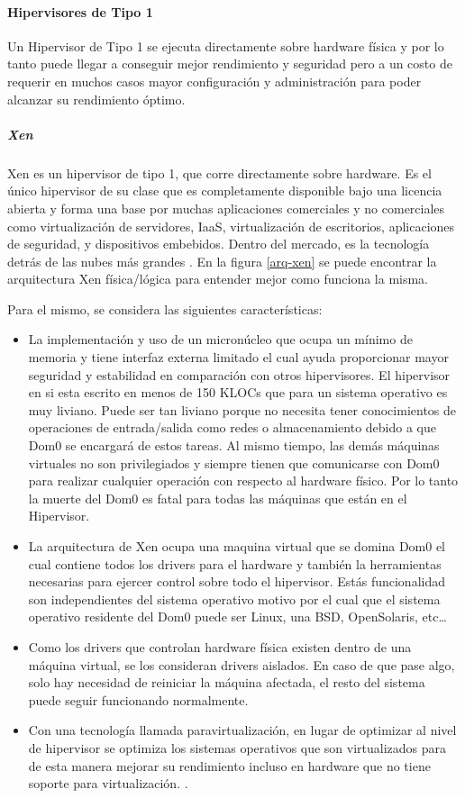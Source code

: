 \paragraph{Hipervisores de Tipo 1}
Un Hipervisor de Tipo 1 se ejecuta directamente sobre hardware física \citep{IBM-Hypervisors} y por lo tanto puede llegar a conseguir mejor rendimiento y seguridad pero a un costo de requerir en muchos casos mayor configuración y administración para poder alcanzar su rendimiento óptimo.

\subparagraph{Xen}
Xen es un hipervisor de tipo 1, que corre directamente sobre hardware. Es el único hipervisor de su clase que es completamente disponible bajo una licencia abierta y forma una base por muchas aplicaciones comerciales y no comerciales como virtualización de servidores, IaaS, virtualización de escritorios, aplicaciones de seguridad, y dispositivos embebidos. Dentro del mercado, es la tecnología detrás de las nubes más grandes \citep{Xen-Project-Overview}. En la figura \ref{arq-xen} se puede encontrar la arquitectura Xen física/lógica para entender mejor como funciona la misma.
 
Para el mismo, se considera las siguientes características:
\begin{itemize}
	\item La implementación y uso de un micronúcleo que ocupa un mínimo de memoria y tiene interfaz externa limitado el cual ayuda proporcionar mayor seguridad y estabilidad en comparación con otros hipervisores. El hipervisor en si esta escrito en menos de 150 KLOCs que para un sistema operativo es muy liviano. Puede ser tan liviano porque no necesita tener conocimientos de operaciones de entrada/salida como redes o almacenamiento debido a que Dom0 se encargará de estos tareas. Al mismo tiempo, las demás máquinas virtuales no son privilegiados y siempre tienen que comunicarse con Dom0 para realizar cualquier operación con respecto al hardware físico. Por lo tanto la muerte del Dom0 es fatal para todas las máquinas que están en el Hipervisor.
    \item La arquitectura de Xen ocupa una maquina virtual que se domina Dom0 el cual contiene todos los drivers para el hardware y también la herramientas necesarias para ejercer control sobre todo el hipervisor. Estás funcionalidad son independientes del sistema operativo motivo por el cual que el sistema operativo residente del Dom0 puede ser Linux, una BSD, OpenSolaris, etc\ldots
    \item Como los drivers que controlan hardware física existen dentro de una máquina virtual, se los consideran drivers aislados. En caso de que pase algo, solo hay necesidad de reiniciar la máquina afectada, el resto del sistema puede seguir funcionando normalmente.
    \item Con una tecnología llamada paravirtualización, en lugar de optimizar al nivel de hipervisor se optimiza los sistemas operativos que son virtualizados para de esta manera mejorar su rendimiento incluso en hardware que no tiene soporte para virtualización. \citep{Xen-Project-Overview}.
\end{itemize}

